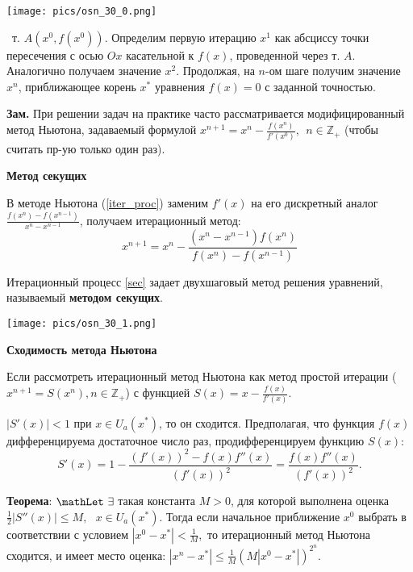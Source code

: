 \texttt{[image: pics/osn\_30\_0.png]}

\faEye \ т. $A(x^0,f(x^0))$. Определим первую итерацию $x^1$ как абсциссу точки пересечения с осью $Ox$ касательной к $f(x)$, проведенной через т. $A$. Аналогично получаем значение $x^2$. Продолжая, на $n$-ом шаге получим значение $x^n$, приближающее корень $x^*$ уравнения $f(x)=0$ с заданной точностью.

\textbf{Зам.} При решении задач на практике часто рассматривается модифицированный
метод Ньютона, задаваемый формулой $ x^{n + 1} = x^n - \frac{f(x^n)}{f'(x^0)},~~n\in\mathbb{Z_+}$ (чтобы считать пр-ую только один раз).

\centerline{\textbf{Метод секущих}}

В методе Ньютона (\ref{iter_proc}) заменим $f'(x)$ на его дискретный аналог $\frac{f(x^n)-f(x^{n-1})}{x^n-x^{n-1}}$, получаем итерационный метод:
\begin{equation}
    x^{n+1} = x^n - \frac{(x^n - x^{n-1})f(x^n)}{f(x^n) - f(x^{n-1})}
    \label{sec}
\end{equation}
  
Итерационный процесс \ref{sec} задает двухшаговый метод решения уравнений, называемый \textbf{методом секущих}.

\texttt{[image: pics/osn\_30\_1.png]}

\centerline{\textbf{Сходимость метода Ньютона}}

Если рассмотреть итерационный метод Ньютона как метод простой итерации ($x^{n+1}=S(x^n), n\in \mathbb{Z_+}$) 
с функцией $S(x) = x - \frac{f(x)}{f'(x)}.$

$|S'(x)| < 1$ при $x \in U_a(x^*)$, то он сходится.
Предполагая, что функция $f(x)$ дифференцируема достаточное число раз,
продифференцируем функцию $S(x)$:
%
$$
    S'(x) = 1 - \frac{(f'(x))^2 - f(x)f''(x)}{(f'(x))^2} =
    \frac{f(x)f''(x)}{(f'(x))^2}.
$$%

\textbf{Теорема}: $\mathLet ~ \exists$ такая константа $M > 0$, для которой выполнена оценка
$\frac{1}{2}\left|S''(x)\right| \leqslant M, ~~~x \in U_a(x^*).$ 
Тогда если начальное приближение $x^0$ выбрать в соответствии с условием
$ |x^0 - x^*| < \frac{1}{M},$
то итерационный метод Ньютона сходится, и имеет место оценка:
$ |x^n - x^*| \leqslant \frac{1}{M}\left(M|x^0 - x^*|\right)^{2^n}.$

